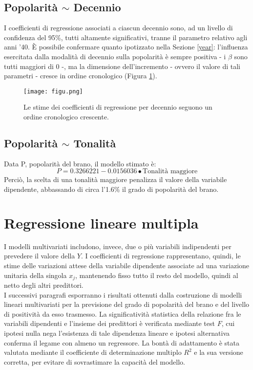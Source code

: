 \documentclass[fleqn,10pt]{SelfArx} %
\begin{document}
\subsection*{Popolarità $\sim$ Decennio}
I coefficienti di regressione associati a ciascun decennio sono, ad un livello di confidenza del 95\%, tutti altamente significativi, tranne il parametro relativo agli anni '40. È possibile confermare quanto ipotizzato nella Sezione \ref{year}: l'influenza esercitata dalla modalità di decennio sulla popolarità è sempre positiva - i $\beta$ sono tutti maggiori di 0 -, ma la dimensione dell'incremento - ovvero il valore di tali parametri - cresce in ordine cronologico (Figura \ref{fig:figu}).
\begin{figure}[h]
    \centering
    \texttt{[image: figu.png]}
    \caption{Le stime dei coefficienti di regressione per decennio seguono un ordine cronologico crescente.}
    \label{fig:figu}
\end{figure}

\subsection*{Popolarità $\sim$ Tonalità}
Data P, popolarità del brano, il modello stimato è:
\begin{equation}
    P=0.3266221-0.0156036\bullet\text{Tonalità maggiore}
\end{equation}
Perciò, la scelta di una tonalità maggiore penalizza il valore della variabile dipendente, abbassando di circa l'1.6\% il grado di popolarità del brano.
\section{Regressione lineare multipla}
I modelli multivariati includono, invece, due o più variabili indipendenti per prevedere il valore della $Y$. I coefficienti di regressione rappresentano, quindi, le stime delle variazioni attese della variabile dipendente associate ad una variazione unitaria della singola $x_j$, mantenendo fisso tutto il resto del modello, quindi al netto degli altri predittori.\\
I successivi paragrafi esporranno i risultati ottenuti dalla costruzione di modelli lineari multivariati per la previsione del grado di popolarità del brano e del livello di positività da esso trasmesso. La significatività statistica della relazione fra le variabili dipendenti e l'insieme dei predittori è verificata mediante test $F$, cui ipotesi nulla nega l'esistenza di tale dipendenza lineare e ipotesi alternativa conferma il legame con almeno un regressore. La bontà di adattamento è stata valutata mediante il coefficiente di determinazione multiplo $R^2$ e la sua versione corretta, per evitare di sovrastimare la capacità del modello. 
\end{document}
